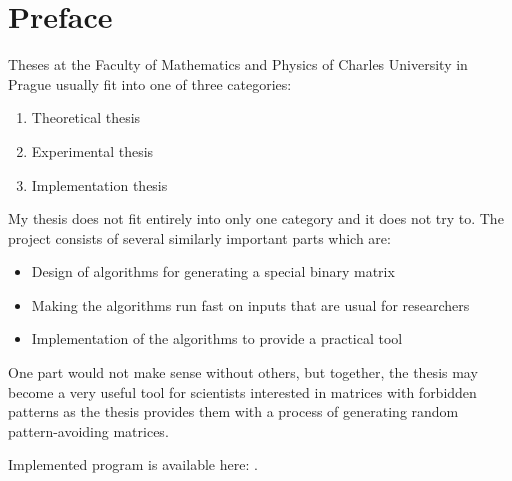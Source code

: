\chapter*{Preface}
Theses at the Faculty of Mathematics and Physics of Charles University in Prague usually fit into one of three categories:
\begin{enumerate}
\item Theoretical thesis
\item Experimental thesis
\item Implementation thesis
\end{enumerate}
My thesis does not fit entirely into only one category and it does not try to. The project consists of several similarly important parts which are:
\begin{itemize}
\item Design of algorithms for generating a special binary matrix
\item Making the algorithms run fast on inputs that are usual for researchers
\item Implementation of the algorithms to provide a practical tool
\end{itemize}
One part would not make sense without others, but together, the thesis may become a very useful tool for scientists interested in matrices with forbidden patterns as the thesis provides them with a process of generating random pattern-avoiding matrices.

Implemented program is available here: \cite{program}.
